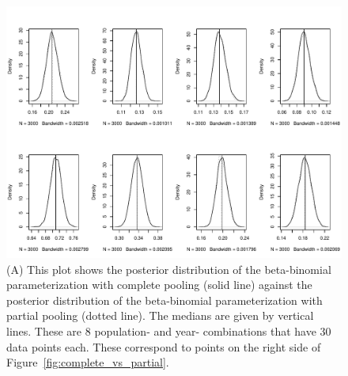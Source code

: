 \documentclass[12pt, oneside, titlepage]{article}   	%
\begin{document}
 \begin{figure}[h]
   \centering
       \includegraphics[page=1,width=.9\textwidth]{../figures/appendix-x-match}  
    \caption{ (A) This plot shows the posterior distribution of the beta-binomial parameterization with complete pooling (solid line) against the posterior distribution of the beta-binomial parameterization with partial pooling (dotted line). The medians are given by vertical lines. These are 8 population- and year- combinations that have 30 data points each. These correspond to points on the right side of Figure~\ref{fig:complete_vs_partial}. }
 \label{fig:match}
\end{figure}
\end{document}
